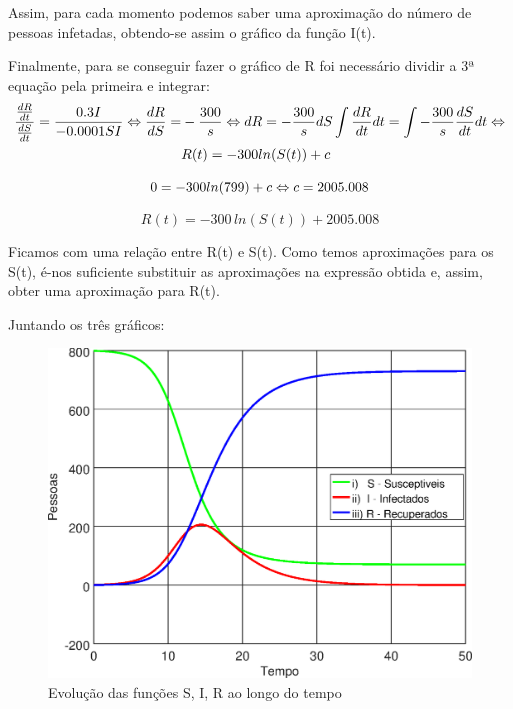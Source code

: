 \documentclass[portuguese, a4paper]{article}
\begin{document}
		Assim, para cada momento podemos saber uma aproximação do número de
		pessoas infetadas, obtendo-se assim	o gráfico da função I(t).

		Finalmente, para se conseguir fazer o gráfico de R foi necessário
		dividir a 3ª equação pela primeira e integrar:
		\begin{equation}
		\begin{split}
			\frac{\frac{dR}{dt}}{\frac{dS}{dt}} = \frac{0.3 I}{-0.0001 S I}
			\Leftrightarrow
			\frac{dR}{dS} = &-\frac{300}{s} \Leftrightarrow dR =
			-\frac{300}{s} dS
			\int \frac{dR}{dt}dt = \int -\frac{300}{s} \frac{dS}{dt}dt
			\Leftrightarrow \\ \newline
			& R(t) = -300 ln(S(t)) + c
		\end{split}
		\end{equation}

		\begin{equation}
			0 = -300 ln(799) + c \Leftrightarrow \\
			c = 2005.008 \\
		\end{equation}

		\begin{equation}
			R(t) = -300\, ln(S(t)) + 2005.008
		\end{equation}


		Ficamos com uma relação entre R(t) e S(t). Como temos aproximações para os S(t),
		é-nos suficiente substituir as aproximações na expressão obtida e, assim, obter uma aproximação para R(t).

		Juntando os três gráficos:

		\begin{figure}[H]
			\centering
			\includegraphics[width=0.80\linewidth]{IIIc_fitted}
			\captionsetup{width=0.80\linewidth}
			\caption[Caption]{Evolução das funções S, I, R ao longo do tempo
			\footnotemark}
		\end{figure}
\end{document}
